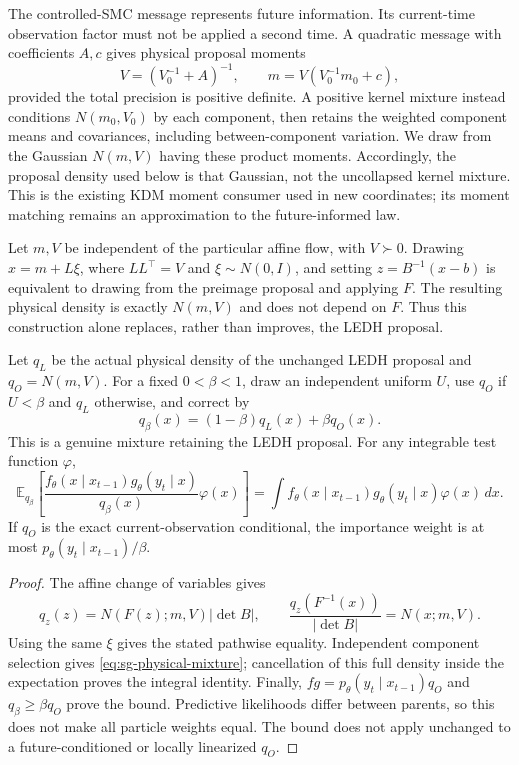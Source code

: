 The controlled-SMC message represents future information. Its current-time
observation factor must not be applied a second time. A quadratic message
with coefficients $A,c$ gives physical proposal moments
\[
 V=(V_0^{-1}+A)^{-1},\qquad m=V(V_0^{-1}m_0+c),
\]
provided the total precision is positive definite. A positive kernel mixture
instead conditions $N(m_0,V_0)$ by each component, then retains the weighted
component means and covariances, including between-component variation.
We draw from the Gaussian $N(m,V)$ having these product moments. Accordingly,
the proposal density used below is that Gaussian, not the uncollapsed kernel
mixture. This is the existing KDM moment consumer used in new coordinates;
its moment matching remains an approximation to the future-informed law.

\begin{proposition}
\label{prop:sg-flow-cancellation}
Let $m,V$ be independent of the particular affine flow, with $V\succ0$.
Drawing $x=m+L\xi$, where $LL^\top=V$ and $\xi\sim N(0,I)$, and setting
$z=B^{-1}(x-b)$ is equivalent to drawing from the preimage proposal and
applying $F$. The resulting physical density is exactly $N(m,V)$ and does
not depend on $F$. Thus this construction alone replaces, rather than
improves, the LEDH proposal.

Let $q_L$ be the actual physical density of the unchanged LEDH proposal
and $q_O=N(m,V)$. For a fixed $0<\beta<1$, draw an independent uniform
$U$, use $q_O$ if $U<\beta$ and $q_L$ otherwise, and correct by
\begin{equation}
 q_\beta(x)=(1-\beta)q_L(x)+\beta q_O(x).
 \label{eq:sg-physical-mixture}
\end{equation}
This is a genuine mixture retaining the LEDH proposal. For any integrable
test function $\varphi$,
\[
 \mathbb E_{q_\beta}\!\left[
   \frac{f_\theta(x\mid x_{t-1})g_\theta(y_t\mid x)}{q_\beta(x)}
   \varphi(x)\right]
 =\int f_\theta(x\mid x_{t-1})g_\theta(y_t\mid x)\varphi(x)\,dx.
\]
If $q_O$ is the exact current-observation conditional, the importance
weight is at most $p_\theta(y_t\mid x_{t-1})/\beta$.
\end{proposition}
\begin{proof}
The affine change of variables gives
\[
 q_z(z)=N(F(z);m,V)|\det B|,\qquad
 \frac{q_z(F^{-1}(x))}{|\det B|}=N(x;m,V).
\]
Using the same $\xi$ gives the stated
pathwise equality. Independent component selection gives
\eqref{eq:sg-physical-mixture}; cancellation of this full density inside
the expectation proves the integral identity. Finally,
$fg=p_\theta(y_t\mid x_{t-1})q_O$ and $q_\beta\geq\beta q_O$ prove the
bound. Predictive likelihoods differ between parents, so this does not
make all particle weights equal. The bound does not apply unchanged to a
future-conditioned or locally linearized $q_O$.
\end{proof}

